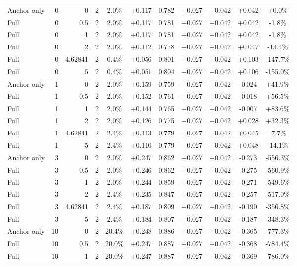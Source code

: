 \begin{table}[htbp]
\begin{tabular}{lrrrccccccc}
Anchor only & 0 & 0 & 2 & 2.0\% & +0.117 & 0.782 & +0.027 & +0.042 & +0.042 & +0.0\% \\
Full & 0 & 0.5 & 2 & 2.0\% & +0.117 & 0.781 & +0.027 & +0.042 & +0.042 & -1.8\% \\
Full & 0 & 1 & 2 & 2.0\% & +0.117 & 0.781 & +0.027 & +0.042 & +0.042 & -1.8\% \\
Full & 0 & 2 & 2 & 2.0\% & +0.112 & 0.778 & +0.027 & +0.042 & +0.047 & -13.4\% \\
Full & 0 & 4.62841 & 2 & 0.4\% & +0.056 & 0.801 & +0.027 & +0.042 & +0.103 & -147.7\% \\
Full & 0 & 5 & 2 & 0.4\% & +0.051 & 0.804 & +0.027 & +0.042 & +0.106 & -155.0\% \\
Anchor only & 1 & 0 & 2 & 2.0\% & +0.159 & 0.759 & +0.027 & +0.042 & -0.024 & +41.9\% \\
Full & 1 & 0.5 & 2 & 2.0\% & +0.152 & 0.761 & +0.027 & +0.042 & -0.018 & +56.5\% \\
Full & 1 & 1 & 2 & 2.0\% & +0.144 & 0.765 & +0.027 & +0.042 & -0.007 & +83.6\% \\
Full & 1 & 2 & 2 & 2.0\% & +0.126 & 0.775 & +0.027 & +0.042 & +0.028 & +32.3\% \\
Full & 1 & 4.62841 & 2 & 2.4\% & +0.113 & 0.779 & +0.027 & +0.042 & +0.045 & -7.7\% \\
Full & 1 & 5 & 2 & 2.4\% & +0.110 & 0.779 & +0.027 & +0.042 & +0.048 & -14.1\% \\
Anchor only & 3 & 0 & 2 & 2.0\% & +0.247 & 0.862 & +0.027 & +0.042 & -0.273 & -556.3\% \\
Full & 3 & 0.5 & 2 & 2.0\% & +0.246 & 0.862 & +0.027 & +0.042 & -0.275 & -560.9\% \\
Full & 3 & 1 & 2 & 2.0\% & +0.244 & 0.859 & +0.027 & +0.042 & -0.271 & -549.6\% \\
Full & 3 & 2 & 2 & 2.4\% & +0.235 & 0.847 & +0.027 & +0.042 & -0.257 & -517.0\% \\
Full & 3 & 4.62841 & 2 & 2.4\% & +0.187 & 0.809 & +0.027 & +0.042 & -0.190 & -356.8\% \\
Full & 3 & 5 & 2 & 2.4\% & +0.184 & 0.807 & +0.027 & +0.042 & -0.187 & -348.3\% \\
Anchor only & 10 & 0 & 2 & 20.4\% & +0.248 & 0.886 & +0.027 & +0.042 & -0.365 & -777.3\% \\
Full & 10 & 0.5 & 2 & 20.0\% & +0.247 & 0.887 & +0.027 & +0.042 & -0.368 & -784.4\% \\
Full & 10 & 1 & 2 & 20.0\% & +0.247 & 0.887 & +0.027 & +0.042 & -0.369 & -786.0\% \\

\end{tabular}
\end{table}
